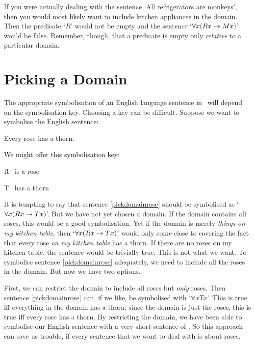 If you were actually dealing with the sentence `All refrigerators are monkeys', then you would most likely want to include kitchen appliances in the domain. Then the predicate `$R$' would not be empty and the sentence `$\forall x(Rx \rightarrow Mx)$' would be false. Remember, though, that a predicate is empty only \emph{relative} to a particular domain. 

\section{Picking a Domain}


The appropriate symbolisation of an English language sentence in \FOL\ will depend on the symbolisation key. Choosing a key can be difficult. Suppose we want to symbolise the English sentence:
	\begin{earg}
		\item[\ex{pickdomainrose}] Every rose has a thorn.
	\end{earg}
We might offer this symbolisation key:
	\begin{ekey}
		\item[R] \blank\ is a rose
		\item[T] \blank\ has a thorn
	\end{ekey}
It is tempting to say that sentence \ref{pickdomainrose} should be symbolised as `$\forall x(Rx \rightarrow Tx)$'. But we have not yet chosen a domain. If the domain contains all roses, this would be a good symbolisation. Yet if the domain is merely \emph{things on my kitchen table}, then `$\forall x(Rx \rightarrow Tx)$' would only come close to covering the fact that every rose \emph{on my kitchen table} has a thorn. If there are no roses on my kitchen table, the sentence would be trivially true. This is not what we want. To symbolise sentence \ref{pickdomainrose} adequately, we need to include all the roses in the domain. But now we have two options. 

First, we can restrict the domain to include all roses but \emph{only} roses. Then sentence \ref{pickdomainrose} can, if we like, be symbolised with `$\forall x Tx$'. This is true iff everything in the domain has a thorn; since the domain is just the roses, this is true iff every rose has a thorn. By restricting the domain, we have been able to symbolise our English sentence with a very short sentence of \FOL. So this approach can save us trouble, if every sentence that we want to deal with is about roses.

